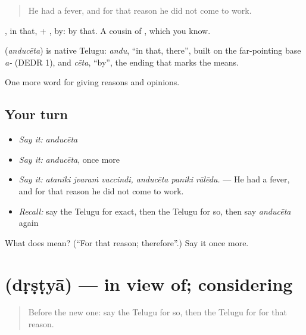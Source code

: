 \begin{quote}
He had a fever, and for that reason he did not come to work.
\end{quote}

, in that, + , by: by that. A cousin of , which you know.

\begin{cousinweb}
\textbf{} (\emph{anducēta}) is native Telugu: \emph{andu}, \textquotedblleft{}in that, there\textquotedblright{}, built on the far-pointing base \emph{a-} (DEDR 1), and \emph{cēta}, \textquotedblleft{}by\textquotedblright{}, the ending that marks the means.
\end{cousinweb}

\begin{grammarlens}[title={What you've built}]
One more word for giving reasons and opinions.
\end{grammarlens}

\subsection*{Your turn}
\begin{itemize}
\raggedright
  \item \emph{Say it:} \emph{anducēta}
  \item \emph{Say it:} \emph{anducēta}, once more
  \item \emph{Say it:} \emph{ataniki jvaraṁ vaccindi, anducēta paniki rālēdu.} — He had a fever, and for that reason he did not come to work.
  \item \emph{Recall:} say the Telugu for exact, then the Telugu for so, then say \emph{anducēta} again
\end{itemize}

\begin{tcolorbox}[breakable,colback=teal!4,colframe=teal!35!black,title={Before you move on}]
What does  mean? (\textquotedblleft{}For that reason; therefore\textquotedblright{}.) Say it once more.
\end{tcolorbox}
\section[\texorpdfstring{\te{దృష్ట్యా} (dṛṣṭyā)}{దృష్ట్యా (dṛṣṭyā)}]{ (dṛṣṭyā) — in view of; considering}

\label{lesson:TE-C395-drstya}



\begin{quote}
Before the new one: say the Telugu for so, then the Telugu for for that reason.
\end{quote}

